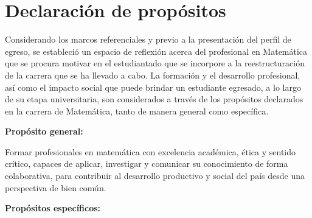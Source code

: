 
\section{Declaración de propósitos}

Considerando los marcos referenciales y previo a la presentación del perfil de egreso, se estableció un espacio de reflexión acerca del profesional en Matemática que se procura motivar en el estudiantado que se incorpore a la reestructuración de la carrera que se ha llevado a cabo. La formación y el desarrollo profesional, así como el impacto social que puede brindar un estudiante egresado, a lo largo de su etapa universitaria, son considerados a través de los propósitos declarados en la carrera de Matemática, tanto de manera general como específica. 

\textbf{Propósito general:}

Formar profesionales en matemática con excelencia académica, ética y sentido crítico, capaces de aplicar, investigar y comunicar su conocimiento de forma colaborativa, para contribuir al desarrollo productivo y social del país desde una perspectiva de bien común. 

\textbf{Propósitos específicos:} 

